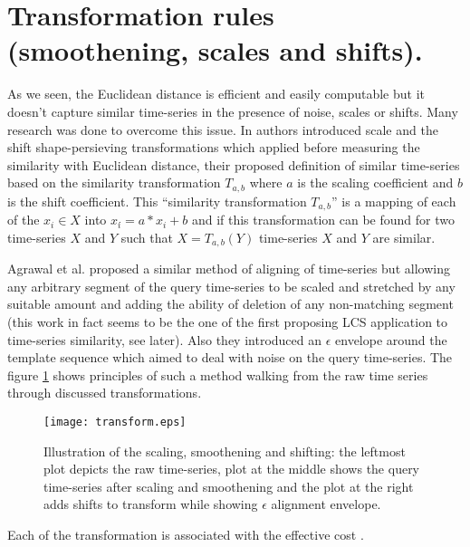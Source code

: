 \section{Transformation rules (smoothening, scales and shifts).}
As we seen, the Euclidean distance is efficient and easily computable but it doesn't capture similar time-series in the presence of noise, scales or shifts. Many research was done to overcome this issue. In \cite{citeulike:3815880} authors introduced scale and the shift shape-persieving transformations which applied before measuring the similarity with Euclidean distance, their proposed definition of similar time-series based on the similarity transformation $T_{a,b}$ where $a$ is the scaling coefficient and $b$ is the shift coefficient. This ``similarity transformation $T_{a,b}$'' is a mapping of each of the $x_{i} \in X$ into $x_{i}\acute{} = a*x_{i}+b$ and if this transformation can be found for two time-series $X$ and $Y$ such that $X=T_{a,b}(Y)$ time-series $X$ and $Y$ are similar.

Agrawal et al. \cite{citeulike:3816327} proposed a similar method of aligning of time-series but allowing any arbitrary segment of the query time-series to be scaled and stretched by any suitable amount and adding the ability of deletion of any non-matching segment (this work in fact seems to be the one of the first proposing LCS application to time-series similarity, see later). Also they introduced an $\epsilon$ envelope around the template sequence which aimed to deal with noise on the query time-series. The figure  \ref{fig:transform} shows principles of such a method walking from the raw time series through discussed transformations.

\begin{figure}[tbp]
   \centering
   \texttt{[image: transform.eps]}
   \caption{Illustration of the scaling, smoothening and shifting: the leftmost plot depicts the raw time-series, plot at the middle shows the query time-series after scaling and smoothening and the plot at the right adds shifts to transform while showing $\epsilon$ alignment envelope.}
   \label{fig:transform}
\end{figure} 

Each of the transformation is associated with the effective cost .

